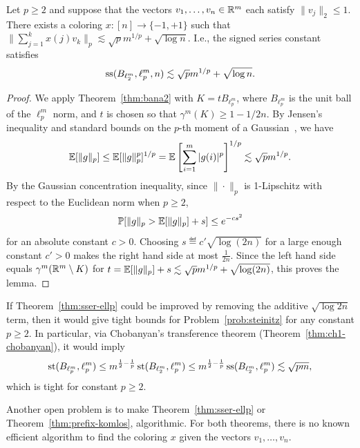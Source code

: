\begin{theorem}\label{thm:sser-ellp}
  Let $p \ge 2$ and suppose that the vectors $v_1, \ldots, v_n \in
  \mathbb{R}^m$ each satisfy $\|v_j\|_2 \le 1$. There exists a coloring $x:[n]
  \to \{-1,+1\}$ such that $\|\sum_{j=1}^kx(j)v_k\|_p \lesssim
  \sqrt{p}m^{1/p} + \sqrt{\log n}$. I.e., the signed series constant satisfies 
  \[
  \operatorname{ss}(B_{\ell_2^m},\ell_p^m,n) \lesssim \sqrt{p}m^{1/p} + \sqrt{\log n}.
  \]
\end{theorem}
\begin{proof}
  We apply Theorem~\ref{thm:bana2} with $K = tB_{\ell_p^m}$, where
  $B_{\ell_p^m}$ is the unit ball of the $\ell_p^m$ norm, and $t$ is
  chosen so that $\gamma^m(K) \ge 1 - 1/2n$. %
  By Jensen's inequality
  and standard bounds on the $p$-th moment of a
  Gaussian~\cite[Proposition 2.5.2]{vershynin}, we have
  \[
    \mathbb{E}[\|g\|_p] \le \mathbb{E}[\|g\|_p^p]^{1/p}
    = \mathbb{E}\left[\sum_{i=1}^m |g(i)|^p\right]^{1/p} \lesssim \sqrt{p}m^{1/p}.
  \]
  By the Gaussian concentration inequality, since $\|\cdot\|_p$ is
  1-Lipschitz with respect to the Euclidean norm when $p \ge 2$,
  \[
    \mathbb{P}[\|g\|_p > \mathbb{E}[\|g\|_p] + s] \le e^{-c s^2}
  \]
  for an absolute constant $c > 0$. Choosing $s \eqdef c'
  \sqrt{\log(2n)}$ for a large enough constant $c' > 0$ makes  the
  right hand side at most $\frac{1}{2n}$. Since the left hand side
  equals $\gamma^m(\mathbb{R}^m\setminus K)$ for $t = \mathbb{E}[\|g\|_p] + s
  \lesssim \sqrt{p}m^{1/p} + \sqrt{\log(2n)}$, this proves the lemma.
\end{proof}


If Theorem~\ref{thm:sser-ellp} could be improved by removing the
additive $\sqrt{\log 2n}$ term, then it would give tight bounds for
Problem~\ref{prob:steinitz} for any constant $p \ge 2$. In particular, via
Chobanyan's transference theorem (Theorem~\ref{thm:ch1-chobanyan}), it would imply
\[
  \operatorname{st}(B_{\ell_p^m}, \ell_p^m) \le m^{\frac12 - \frac1p}\operatorname{st}(B_{\ell_2^m}, \ell_p^m) 
  \le m^{\frac12 - \frac1p}\operatorname{ss}(B_{\ell_2^m}, \ell_p^m) 
  \lesssim \sqrt{pm},
\]
which is tight for constant $p \ge 2$. %

Another open
problem is to make Theorem~\ref{thm:sser-ellp} or Theorem~\ref{thm:prefix-komlos},
algorithmic. For both theorems, there is no known efficient algorithm to find
the coloring $x$ given the vectors $v_1, \ldots, v_n$.

